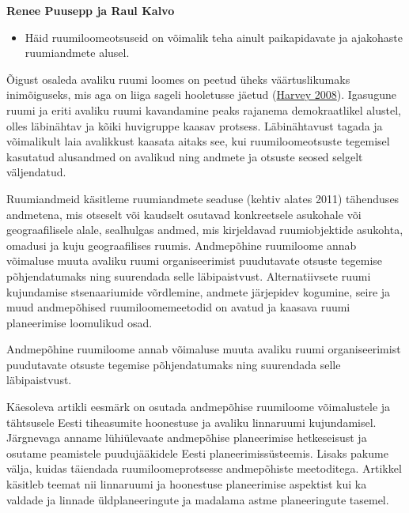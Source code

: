 \documentclass[estonian,]{article}
\providecommand{\tightlist}{%
  \setlength{\itemsep}{0pt}\setlength{\parskip}{0pt}}
\begin{document}
\begin{authors}
\textbf{Renee Puusepp ja Raul Kalvo}
\end{authors}

\begin{points}
\begin{itemize}
\tightlist
\item
  Häid ruumiloomeotsuseid on võimalik teha ainult paikapidavate ja
  ajakohaste ruumiandmete alusel.
\end{itemize}
\end{points}

Õigust osaleda avaliku ruumi loomes on peetud üheks väärtuslikumaks inimõiguseks, mis aga on liiga sageli hooletusse jäetud (\protect\hyperlink{Harvey2008}{Harvey 2008}). Igasugune ruumi ja eriti avaliku ruumi kavandamine peaks rajanema demokraatlikel alustel, olles läbinähtav ja kõiki huvigruppe kaasav protsess. Läbinähtavust tagada ja võimalikult laia avalikkust kaasata aitaks see, kui ruumiloomeotsuste tegemisel kasutatud alusandmed on avalikud ning andmete ja otsuste seosed selgelt väljendatud.

Ruumiandmeid käsitleme ruumiandmete seaduse (kehtiv alates 2011) tähenduses andmetena, mis otseselt või kaudselt osutavad konkreetsele asukohale või geograafilisele alale, sealhulgas andmed, mis kirjeldavad ruumiobjektide asukohta, omadusi ja kuju geograafilises ruumis. Andmepõhine ruumiloome annab võimaluse muuta avaliku ruumi organiseerimist puudutavate otsuste tegemise põhjendatumaks ning suurendada selle läbipaistvust. Alternatiivsete ruumi kujundamise stsenaariumide võrdlemine, andmete järjepidev kogumine, seire ja muud andmepõhised ruumiloomemeetodid on avatud ja kaasava ruumi planeerimise loomulikud osad.

\begin{blockquote-right}
Andmepõhine ruumiloome annab võimaluse muuta avaliku ruumi
organiseerimist puudutavate otsuste tegemise põhjendatumaks ning
suurendada selle läbipaistvust.
\end{blockquote-right}

Käesoleva artikli eesmärk on osutada andmepõhise ruumiloome võimalustele ja tähtsusele Eesti tiheasumite hoonestuse ja avaliku linnaruumi kujundamisel. Järgnevaga anname lühiülevaate andmepõhise planeerimise hetkeseisust ja osutame peamistele puudujääkidele Eesti planeerimissüsteemis. Lisaks pakume välja, kuidas täiendada ruumiloomeprotsesse andmepõhiste meetoditega. Artikkel käsitleb teemat nii linnaruumi ja hoonestuse planeerimise aspektist kui ka valdade ja linnade üldplaneeringute ja madalama astme planeeringute tasemel.
\end{document}
